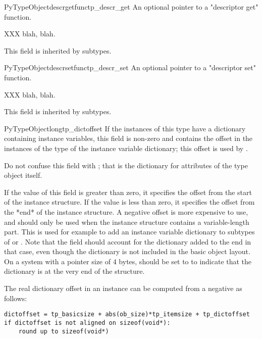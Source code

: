 \begin{cmemberdesc}{PyTypeObject}{descrgetfunc}{tp_descr_get}
  An optional pointer to a "descriptor get" function.

  XXX blah, blah.

  This field is inherited by subtypes.
\end{cmemberdesc}

\begin{cmemberdesc}{PyTypeObject}{descrsetfunc}{tp_descr_set}
  An optional pointer to a "descriptor set" function.

  XXX blah, blah.

  This field is inherited by subtypes.
\end{cmemberdesc}

\begin{cmemberdesc}{PyTypeObject}{long}{tp_dictoffset}
  If the instances of this type have a dictionary containing instance
  variables, this field is non-zero and contains the offset in the
  instances of the type of the instance variable dictionary; this
  offset is used by .

  Do not confuse this field with ; that is the
  dictionary for attributes of the type object itself.

  If the value of this field is greater than zero, it specifies the
  offset from the start of the instance structure.  If the value is
  less than zero, it specifies the offset from the *end* of the
  instance structure.  A negative offset is more expensive to use, and
  should only be used when the instance structure contains a
  variable-length part.  This is used for example to add an instance
  variable dictionary to subtypes of  or .
  Note that the  field should account for the
  dictionary added to the end in that case, even though the dictionary
  is not included in the basic object layout.  On a system with a
  pointer size of 4 bytes,  should be set to
   to indicate that the dictionary is at the very end of the
  structure.

  The real dictionary offset in an instance can be computed from a
  negative  as follows:

\begin{verbatim}
dictoffset = tp_basicsize + abs(ob_size)*tp_itemsize + tp_dictoffset
if dictoffset is not aligned on sizeof(void*):
    round up to sizeof(void*)
\end{verbatim}


\end{cmemberdesc}
